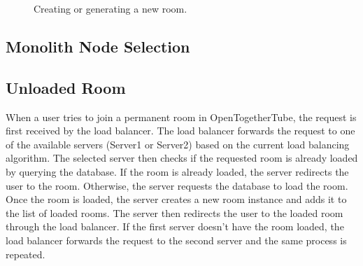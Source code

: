 \begin{figure}[!htb]
  \centering
  \caption{\label{Figure::create-room-diag} Creating or generating a new room.}
\end{figure}

\subsection{Monolith Node Selection}

\subsection{Unloaded Room}
When a user tries to join a permanent room in OpenTogetherTube, the request is first received by the load balancer. 
The load balancer forwards the request to one of the available servers (Server1 or Server2) based on the current load
balancing algorithm. The selected server then checks if the requested room is already loaded by querying the database. 
If the room is already loaded, the server redirects the user to the room. Otherwise, the server requests the database to 
load the room. Once the room is loaded, the server creates a new room instance and adds it to the list of loaded rooms. 
The server then redirects the user to the loaded room through the load balancer. If the first server doesn't have the
room loaded, the load balancer forwards the request to the second server and the same process is repeated.

